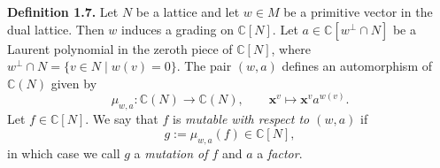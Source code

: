 \par\noindent\textbf{Definition 1.7.} 
Let $N$ be a lattice and let $w\in M$ be a primitive vector in the dual lattice. Then $w$ induces a grading on $\mathbb{C}[N]$. Let $a\in\mathbb{C}[w^\perp\cap N]$ be a Laurent polynomial in the zeroth piece of $\mathbb{C}[N]$, where $w^\perp\cap N=\{v\in N\mid w(v)=0\}$. The pair $(w,a)$ defines an automorphism of $\mathbb{C}(N)$ given by
\[
\mu_{w,a}:\mathbb{C}(N)\rightarrow\mathbb{C}(N),\qquad\bm{x}^v\mapsto\bm{x}^v a^{w(v)}.
\]
Let $f\in\mathbb{C}[N]$. We say that $f$ is \emph{mutable with respect to $(w,a)$} if
\[
g:=\mu_{w,a}(f)\in\mathbb{C}[N],
\]
in which case we call $g$ a \emph{mutation of $f$} and $a$ a \emph{factor}.

\par

